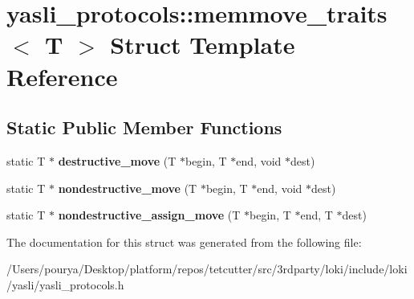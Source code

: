 \hypertarget{structyasli__protocols_1_1memmove__traits}{}\section{yasli\+\_\+protocols\+:\+:memmove\+\_\+traits$<$ T $>$ Struct Template Reference}
\label{structyasli__protocols_1_1memmove__traits}
\subsection*{Static Public Member Functions}
\begin{DoxyCompactItemize}
\item 
\hypertarget{structyasli__protocols_1_1memmove__traits_a3daf90ab07654c451bdc1efdb57619bf}{}static T $\ast$ {\bfseries destructive\+\_\+move} (T $\ast$begin, T $\ast$end, void $\ast$dest)\label{structyasli__protocols_1_1memmove__traits_a3daf90ab07654c451bdc1efdb57619bf}

\item 
\hypertarget{structyasli__protocols_1_1memmove__traits_a9bf84e80d6f347fdd4f5da0990eeeb93}{}static T $\ast$ {\bfseries nondestructive\+\_\+move} (T $\ast$begin, T $\ast$end, void $\ast$dest)\label{structyasli__protocols_1_1memmove__traits_a9bf84e80d6f347fdd4f5da0990eeeb93}

\item 
\hypertarget{structyasli__protocols_1_1memmove__traits_ad0d29c1b23cf4d8b98fd9f0c38bca4fb}{}static T $\ast$ {\bfseries nondestructive\+\_\+assign\+\_\+move} (T $\ast$begin, T $\ast$end, T $\ast$dest)\label{structyasli__protocols_1_1memmove__traits_ad0d29c1b23cf4d8b98fd9f0c38bca4fb}

\end{DoxyCompactItemize}


The documentation for this struct was generated from the following file\+:\begin{DoxyCompactItemize}
\item 
/\+Users/pourya/\+Desktop/platform/repos/tetcutter/src/3rdparty/loki/include/loki/yasli/yasli\+\_\+protocols.\+h\end{DoxyCompactItemize}
